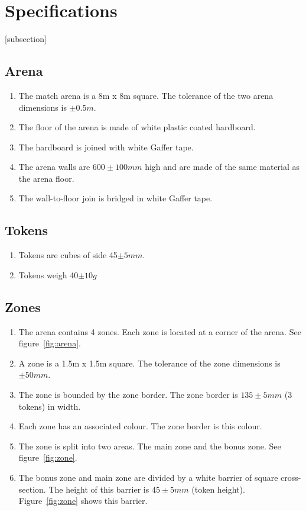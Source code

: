 \section{Specifications}
[subsection]
\newcommand{\rcnii}{\stepcounter{rulei}\arabic{section}.\arabic{subsection}.\arabic{rulei}}
\renewcommand{\labelenumi}{\rcnii}

\subsection{Arena}
\begin{enumerate}
\item The match arena is a 8m x 8m square.  The tolerance of the two arena dimensions is $\pm0.5m$.
\item The floor of the arena is made of white plastic coated hardboard.
\item The hardboard is joined with white Gaffer tape.
\item The arena walls are $600\pm100mm$ high and are made of the same material as the arena floor.
\item The wall-to-floor join is bridged in white Gaffer tape.
\end{enumerate}

\subsection{Tokens}
\label{tokens}

\begin {enumerate} 
\item Tokens are cubes of side 45$\pm5mm$.
\item Tokens weigh 40$\pm10g$
\end {enumerate}

\subsection{Zones}
\begin {enumerate}
\item The arena contains 4 zones.  Each zone is located at a corner of the arena.  See figure~\ref{fig:arena}.
\item A zone is a 1.5m x 1.5m square.  The tolerance of the zone dimensions is $\pm50mm$.
\item The zone is bounded by the zone border.  The zone border is $135\pm5mm$ (3 tokens) in width.
\item Each zone has an associated colour.  The zone border is this colour.
\item The zone is split into two areas.  The main zone and the bonus zone.  See figure~\ref{fig:zone}.
\item The bonus zone and main zone are divided by a white barrier of square cross-section.  The height of this barrier is $45\pm5mm$ (token height).  Figure~\ref{fig:zone} shows this barrier.
\end {enumerate}


